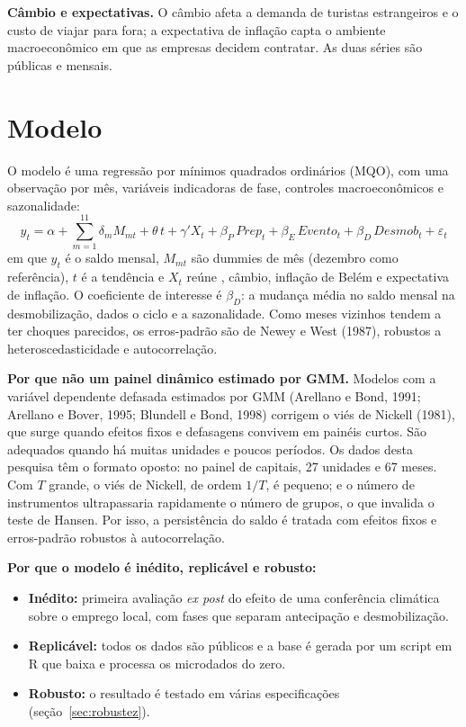 \textbf{Câmbio e expectativas.} O câmbio afeta a demanda de turistas estrangeiros e o custo de viajar
para fora; a expectativa de inflação capta o ambiente macroeconômico em que as empresas decidem
contratar. As duas séries são públicas e mensais.


\section{Modelo}

O modelo é uma regressão por mínimos quadrados ordinários (MQO), com uma observação por mês, variáveis
indicadoras de fase, controles macroeconômicos e sazonalidade:
\begin{equation}
y_t = \alpha + \sum_{m=1}^{11}\delta_m M_{mt} + \theta\, t + \gamma' X_t
      + \beta_P\, Prep_t + \beta_E\, Evento_t + \beta_D\, Desmob_t + \varepsilon_t
\end{equation}
em que $y_t$ é o saldo mensal, $M_{mt}$ são dummies de mês (dezembro como referência), $t$ é a
tendência e $X_t$ reúne , câmbio, inflação de Belém e expectativa de inflação. O
coeficiente de interesse é $\beta_D$: a mudança média no saldo mensal na desmobilização, dados o
ciclo e a sazonalidade. Como meses vizinhos tendem a ter choques parecidos, os erros-padrão são de Newey e West (1987),
robustos a heteroscedasticidade e autocorrelação.

\textbf{Por que não um painel dinâmico estimado por GMM.} Modelos com a variável dependente defasada
estimados por GMM (Arellano e Bond, 1991; Arellano e Bover, 1995; Blundell e Bond, 1998) corrigem o viés
de Nickell (1981), que surge quando efeitos fixos e defasagens convivem em painéis curtos. São adequados
quando há muitas unidades e poucos períodos. Os dados desta pesquisa têm o formato oposto: no painel de
capitais, 27 unidades e 67 meses. Com $T$ grande, o viés de Nickell, de ordem $1/T$, é pequeno; e o
número de instrumentos ultrapassaria rapidamente o número de grupos, o que invalida o teste de Hansen.
Por isso, a persistência do saldo é tratada com efeitos fixos e erros-padrão robustos à autocorrelação.

\textbf{Por que o modelo é inédito, replicável e robusto:}
\begin{itemize}
  \item \textbf{Inédito:} primeira avaliação \textit{ex post} do efeito de uma conferência climática
        sobre o emprego local, com fases que separam antecipação e desmobilização.
  \item \textbf{Replicável:} todos os dados são públicos e a base é gerada por um script em R que baixa
        e processa os microdados do zero.
  \item \textbf{Robusto:} o resultado é testado em várias especificações (seção~\ref{sec:robustez}).
\end{itemize}

